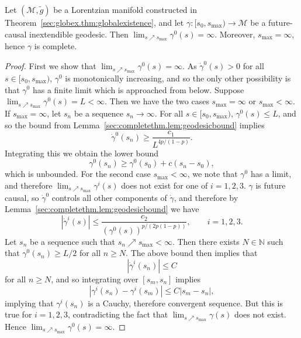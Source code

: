 \documentclass{article}
\newcommand{\NN}{\mathbb{N}}
\newcommand{\mc}{\mathcal}
\newcommand{\wt}{\widetilde}
\newcommand{\ra}{\rightarrow}
\begin{document}
\begin{proposition}\label{sec:completethm.prop:complete}
    Let $(\mc{M},\wt{g})$ be a Lorentzian manifold constructed in Theorem~\ref{sec:globex.thm:globalexistence}, and let $\gamma:[s_0,s_{\max}) \ra \mc{M}$ be a future-causal inextendible geodesic. Then $\lim_{s\nearrow s_{\max}}\gamma^0(s) = \infty$. Moreover, $s_{\max} = \infty$, hence $\gamma$ is complete.
\end{proposition}
\begin{proof}
    First we show that $\lim_{s \nearrow s_{\max}} \gamma^0(s) = \infty$. As $\dot{\gamma}^0(s) > 0$ for all $s \in [s_0,s_{\max})$, $\gamma^0$ is monotonically increasing, and so the only other possibility is that $\gamma^0$ has a finite limit which is approached from below. Suppose $\lim_{s \nearrow s_{\max}}\gamma^0(s) = L < \infty$. Then we have the two cases $s_{\max} = \infty$ or $s_{\max} < \infty$. If $s_{\max} = \infty$, let $s_n$ be a sequence $s_n \ra \infty$. For all $s \in [s_0,s_{\max})$, $\gamma^0(s) \leq L$, and so the bound from Lemma~\ref{sec:completethm.lem:geodesicbound} implies
    \begin{equation}
        \dot{\gamma}^0(s_n) \geq  \frac{c_1}{L^{4p/(1-p)}}.
    \end{equation}
    Integrating this we obtain the lower bound
    \begin{equation}
        \gamma^0(s_n) \geq \gamma^0(s_0) + c(s_n-s_0),
    \end{equation}
    which is unbounded. For the second case $s_{\max} < \infty$, we note that $\gamma^0$ has a limit, and therefore $\lim_{s \nearrow s_{\max}} \gamma^i(s)$ does not exist for one of $i = 1,2,3$. $\gamma$ is future causal, so $\dot{\gamma}^0$ controls all other components of $\dot{\gamma}$, and therefore by Lemma~\ref{sec:completethm.lem:geodesicbound} we have
    \begin{equation}
        |\dot{\gamma}^i(s)|\leq \frac{c_2}{(\gamma^0(s))^{p/(2p(1-p))}},\qquad i=1,2,3.
    \end{equation}
    Let $s_n$ be a sequence such that $s_n \nearrow s_{\max} <\infty$. Then there exists $N \in \NN$ such that $\gamma^0(s_n) \geq L/2$ for all $n \geq N$. The above bound then implies that
    \begin{equation}
        |\dot{\gamma}^i(s_n)| \leq C
    \end{equation}
    for all $n \geq N$, and so integrating over $[s_m,s_n]$ implies
    \begin{equation}
        |\gamma^i(s_n) - \gamma^i(s_m)| \leq C|s_m - s_n|,
    \end{equation}
    implying that $\gamma^i(s_n)$ is a Cauchy, therefore convergent sequence. But this is true for $i=1,2,3$, contradicting the fact that $\lim_{s\nearrow s_{\max}} \gamma(s)$ does not exist. Hence $\lim_{s\nearrow s_{\max}}\gamma^0(s) = \infty$.


\end{proof}
\end{document}
